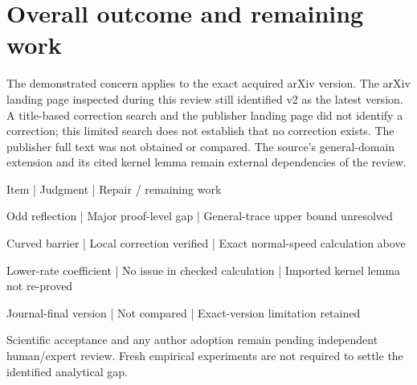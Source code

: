 \documentclass[10pt]{article}
\begin{document}
\section*{Overall outcome and remaining work}
The demonstrated concern applies to the exact acquired arXiv version. The arXiv landing page inspected during this review still identified v2 as the latest version. A title-based correction search and the publisher landing page did not identify a correction; this limited search does not establish that no correction exists. The publisher full text was not obtained or compared. The source’s general-domain extension and its cited kernel lemma remain external dependencies of the review.\par
Item | Judgment | Repair / remaining work\par
Odd reflection | Major proof-level gap | General-trace upper bound unresolved\par
Curved barrier | Local correction verified | Exact normal-speed calculation above\par
Lower-rate coefficient | No issue in checked calculation | Imported kernel lemma not re-proved\par
Journal-final version | Not compared | Exact-version limitation retained\par
Scientific acceptance and any author adoption remain pending independent human/expert review. Fresh empirical experiments are not required to settle the identified analytical gap.\par
\end{document}
